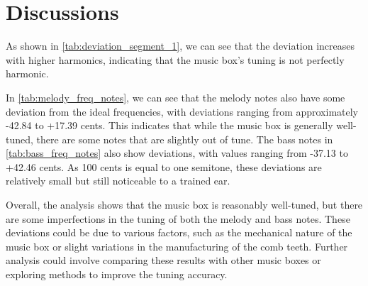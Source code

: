 \chapter{Discussions}


As shown in \autoref{tab:deviation_segment_1}, we can see that the deviation increases with higher harmonics, indicating that the music box's tuning is not perfectly harmonic.

In \autoref{tab:melody_freq_notes}, we can see that the melody notes also have some deviation from the ideal frequencies, with deviations ranging from approximately -42.84 to +17.39 cents. This indicates that while the music box is generally well-tuned, there are some notes that are slightly out of tune. The bass notes in \autoref{tab:bass_freq_notes} also show deviations, with values ranging from -37.13 to +42.46 cents. As 100 cents is equal to one semitone, these deviations are relatively small but still noticeable to a trained ear.

Overall, the analysis shows that the music box is reasonably well-tuned, but there are some imperfections in the tuning of both the melody and bass notes. These deviations could be due to various factors, such as the mechanical nature of the music box or slight variations in the manufacturing of the comb teeth. Further analysis could involve comparing these results with other music boxes or exploring methods to improve the tuning accuracy.

